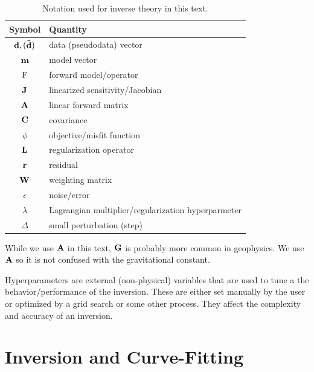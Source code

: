 \begin{table}[h!]
    \centering
    \begin{threeparttable}
    \caption{Notation used for inverse theory in this text.}
    \label{tab:inverse_notation}
    \begin{tabularx}{0.65\textwidth}{@{}cX@{}}
        \toprule
        \textbf{Symbol} & \textbf{Quantity} \\
        \midrule
        $\vb{d}, (\vb{\tilde{d}})$    & data (pseudodata) vector \\
        $\vb{m}$    & model vector \\
        $\operatorname{F}$      & forward model/operator \\
        $\vb{J}$    & linearized sensitivity/Jacobian \\
        $\vb{A}$    & linear forward matrix\tnote{a} \\
        $\vb{C}$    & covariance \\
        $\phi$      & objective/misfit function \\
        $\vb{L}$    & regularization operator \\
        $\vb{r}$    & residual \\
        $\vb{W}$    & weighting matrix \\
        $\epsilon$  & noise/error \\
        $\lambda$   & Lagrangian multiplier/regularization hyperparmeter\tnote{b} \\
        $\Delta$    & small perturbation (step) \\
        \bottomrule
    \end{tabularx}
    \begin{tablenotes}
    \item[a] While we use $\vb{A}$ in this text, $\vb{G}$ is probably more common in geophysics.  We use $\vb{A}$ so it is not confused with the gravitational constant.
    \item[b] Hyperparameters are external (non-physical) variables that are used to tune a the behavior/performance of the inversion.  These are either set manually by the user or optimized by a grid search or some other process. They affect the complexity and accuracy of an inversion.
    \end{tablenotes}
    \end{threeparttable}
\end{table}


\section{Inversion and Curve-Fitting}

